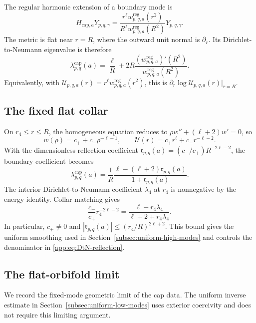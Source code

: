 \documentclass[11pt,a4paper,twoside]{article}
\numberwithin{equation}{section}
\theoremstyle{definition}
\theoremstyle{remark}
\begin{document}
The regular harmonic extension of a boundary mode is
\begin{equation}\label{app:eq:Hcap}
H_{\mathrm{cap},a}Y_{p,q,\gamma}
=\frac{r^\ell w_{p,q,a}^{\mathrm{reg}}(r^2)}
{R^\ell w_{p,q,a}^{\mathrm{reg}}(R^2)}Y_{p,q,\gamma}.
\end{equation}
The metric is flat near \(r=R\), where the outward unit normal is
\(\partial_r\). Its Dirichlet-to-Neumann eigenvalue is therefore
\begin{equation}\label{app:eq:cap-DtN}
\lambda_{p,q}^{\mathrm{cap}}(a)
=\frac\ell R+2R\frac{(w_{p,q,a}^{\mathrm{reg}})'(R^2)}
{w_{p,q,a}^{\mathrm{reg}}(R^2)}.
\end{equation}
Equivalently, with
\(\mathcal U_{p,q,a}(r)=r^\ell w_{p,q,a}^{\mathrm{reg}}(r^2)\),
this is \(\partial_r\log\mathcal U_{p,q,a}(r)|_{r=R}\).

\subsection{The fixed flat collar}

On \(r_4\le r\le R\), the homogeneous equation reduces to
\(\rho w''+(\ell+2)w'=0\), so
\[
w(\rho)=c_++c_-\rho^{-\ell-1},
\qquad
\mathcal U(r)=c_+r^\ell+c_-r^{-\ell-2}.
\]
With the dimensionless reflection coefficient
\(\mathfrak r_{p,q}(a)=(c_-/c_+)R^{-2\ell-2}\), the boundary
coefficient becomes
\begin{equation}\label{app:eq:DtN-reflection}
\lambda_{p,q}^{\mathrm{cap}}(a)
=\frac1R\frac{\ell-(\ell+2)\mathfrak r_{p,q}(a)}
{1+\mathfrak r_{p,q}(a)}.
\end{equation}
The interior Dirichlet-to-Neumann coefficient \(\lambda_4\) at
\(r_4\) is nonnegative by the energy identity. Collar matching gives
\[
\frac{c_-}{c_+}r_4^{-2\ell-2}
=\frac{\ell-r_4\lambda_4}{\ell+2+r_4\lambda_4}.
\]
In particular, \(c_+\ne0\) and
\(|\mathfrak r_{p,q}(a)|\le(r_4/R)^{2\ell+2}\).
This bound gives the uniform smoothing used in
Section~\ref{subsec:uniform-high-modes} and controls the denominator
in \eqref{app:eq:DtN-reflection}.

\subsection{The flat-orbifold limit}

We record the fixed-mode geometric limit of the cap data.
The uniform inverse estimate in Section~\ref{subsec:uniform-low-modes}
uses exterior coercivity and does not require this limiting argument.
\end{document}
